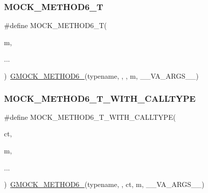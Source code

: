 \mbox{\label{_obj__test_2lib_2googletest-master_2googlemock_2include_2gmock_2gmock-generated-function-mockers_8h_a0d16357a0043d36b167a1c42ef33f672}} 
\subsubsection{\texorpdfstring{MOCK\_METHOD6\_T}{MOCK\_METHOD6\_T}}
{\footnotesize\ttfamily \#define M\+O\+C\+K\+\_\+\+M\+E\+T\+H\+O\+D6\+\_\+T(\begin{DoxyParamCaption}\item[{}]{m,  }\item[{}]{... }\end{DoxyParamCaption})~\mbox{\hyperlink{_obj__test_2lib_2googletest-release-1_88_81_2googlemock_2include_2gmock_2gmock-generated-function-mockers_8h_ad0ca7f6973a076d0af4c953f8ed91842}{G\+M\+O\+C\+K\+\_\+\+M\+E\+T\+H\+O\+D6\+\_\+}}(typename, , , m, \+\_\+\+\_\+\+V\+A\+\_\+\+A\+R\+G\+S\+\_\+\+\_\+)}

\mbox{\label{_obj__test_2lib_2googletest-master_2googlemock_2include_2gmock_2gmock-generated-function-mockers_8h_a0dfe65f974c2b6d60cac3114489b4527}} 
\subsubsection{\texorpdfstring{MOCK\_METHOD6\_T\_WITH\_CALLTYPE}{MOCK\_METHOD6\_T\_WITH\_CALLTYPE}}
{\footnotesize\ttfamily \#define M\+O\+C\+K\+\_\+\+M\+E\+T\+H\+O\+D6\+\_\+\+T\+\_\+\+W\+I\+T\+H\+\_\+\+C\+A\+L\+L\+T\+Y\+PE(\begin{DoxyParamCaption}\item[{}]{ct,  }\item[{}]{m,  }\item[{}]{... }\end{DoxyParamCaption})~\mbox{\hyperlink{_obj__test_2lib_2googletest-release-1_88_81_2googlemock_2include_2gmock_2gmock-generated-function-mockers_8h_ad0ca7f6973a076d0af4c953f8ed91842}{G\+M\+O\+C\+K\+\_\+\+M\+E\+T\+H\+O\+D6\+\_\+}}(typename, , ct, m, \+\_\+\+\_\+\+V\+A\+\_\+\+A\+R\+G\+S\+\_\+\+\_\+)}

